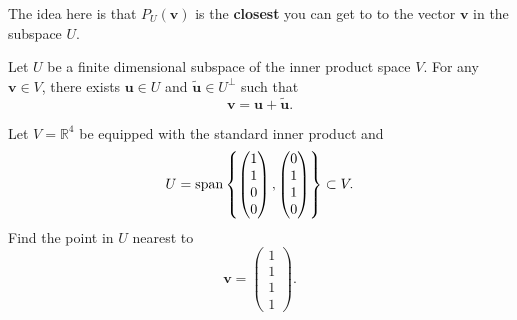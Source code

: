The idea here is that $P_U(\bm v)$ is the \textbf{closest} you can get to to the vector $\bm v$ in the subspace $U$.

\begin{proposition}
    Let $U$ be a finite dimensional subspace of the inner product space $V$. For any $\bm v \in V$, there exists $\bm u \in U$ and $\tilde{\bm u} \in U^{\perp}$ such that \[ \bm v = \bm u + \tilde{\bm u}. \]
\end{proposition}

\begin{example}
    Let $V = \mathbb R^4$ be equipped with the standard inner product and 
    \[ 
        U = \operatorname{span}{
            \left\{ 
            \begin{pmatrix}
                1 \\ 1 \\ 0 \\ 0
            \end{pmatrix}
            ,
            \begin{pmatrix}
                0 \\ 1 \\ 1 \\ 0
            \end{pmatrix}
        \right\}} 
        \subset V.
    \]
    Find the point in $U$ nearest to
    \[
        \bm v =
        \begin{pmatrix}
            1 \\ 1 \\ 1 \\ 1
        \end{pmatrix}
        .
    \]
\end{example}

